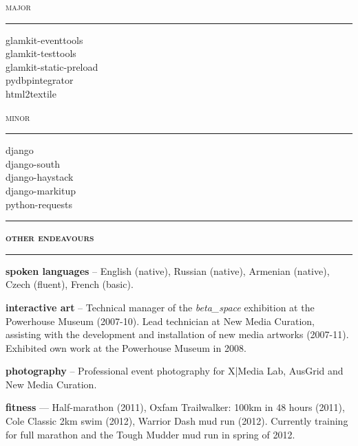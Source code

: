 \documentclass[a4paper,12pt]{article}
\begin{document}
\begin{spacing}{0.95}
\begin{minipage}[t]{95.5mm}
	\begin{minipage}[t]{45.25mm}
		{\large\textsc{major}}\\
		\vspace{-3.1mm}%
		\rule[3mm]{\linewidth}{0.25mm}
				
		{\normalsize
		glamkit-eventtools\\
		glamkit-testtools\\
		glamkit-static-preload\\
		pydbpintegrator\\
		html2textile}
	\end{minipage}%
	\hspace{5mm}%
	\begin{minipage}[t]{45.25mm}
		{\large\textsc{minor}}\\
		\vspace{-3.1mm}%
		\rule[3mm]{\linewidth}{0.25mm}
		
		{\normalsize
		django\\
		django-south\\
		django-haystack\\
		django-markitup\\
		python-requests}
	\end{minipage}

	\vspace{4mm}
	\rule[1mm]{\linewidth}{1mm}
	{\Large\textsc{\textbf{other endeavours}}}\\
	\vspace{2.5mm}%
	\rule[1mm]{\linewidth}{1mm}
	
	{\small
	\textbf{\textsf{spoken languages}} -- English (native), Russian (native), Armenian (native), Czech (fluent), French (basic).
	
	\vspace{3mm}
	\textbf{\textsf{interactive art}} -- Technical manager of the \emph{beta\_space} exhibition at the Powerhouse Museum (2007-10). Lead technician at New Media Curation, assisting with the development and installation of  new media artworks (2007-11). Exhibited own work at the Powerhouse Museum in 2008.
	
	\vspace{3mm}
	\textbf{\textsf{photography}} -- Professional event photography for X|Media Lab, AusGrid and New Media Curation.
	
	\vspace{3mm}
	\textbf{\textsf{fitness}} --- Half-marathon (2011), Oxfam Trailwalker: 100km in 48 hours (2011), Cole Classic 2km swim (2012), Warrior Dash mud run (2012). Currently training for full marathon and the Tough Mudder mud run in spring of 2012.%
	}%
\end{minipage}\\
\vspace{1mm}


\end{spacing}
\end{document}
